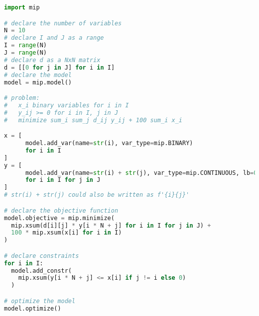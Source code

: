 \documentclass[english]{article}
\begin{document}
\begin{lstlisting}[label={lst:mip-library-quick-reference}, caption={Python \texttt{mip} library quick reference}, language=Python]
import mip

# declare the number of variables
N = 10
# declare I and J as a range
I = range(N)
J = range(N)
# declare d as a NxN matrix
d = [[0 for j in J] for i in I]
# declare the model
model = mip.model()

# problem:
#   x_i binary variables for i in I
#   y_ij >= 0 for i in I, j in J
#   minimize sum_i sum_j d_ij y_ij + 100 sum_i x_i

x = [
      model.add_var(name=str(i), var_type=mip.BINARY)
      for i in I
]
y = [
      model.add_var(name=str(i) + str(j), var_type=mip.CONTINUOUS, lb=0)
      for i in I for j in J
]
# str(i) + str(j) could also be written as f'{i}{j}'

# declare the objective function
model.objective = mip.minimize(
  mip.xsum(d[i][j] * y[i * N + j] for i in I for j in J) +
  100 * mip.xsum(x[i] for i in I)
)

# declare constraints
for i in I:
  model.add_constr(
    mip.xsum(y[i * N + j] <= x[i] if j != i else 0)
  )

# optimize the model
model.optimize()
\end{lstlisting}
\end{document}
